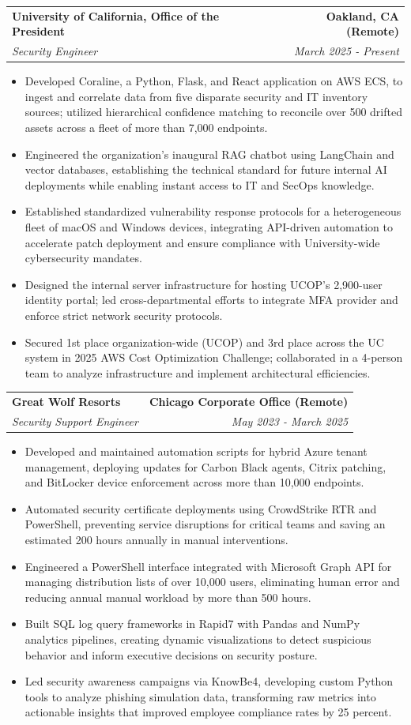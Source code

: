 \documentclass[letterpaper,10pt]{article}
\makeatletter
\newcommand{\resumeItem}[1]{\item\small{#1}}
\newcommand{\resumeItemListStart}{\begin{itemize}}
\newcommand{\resumeItemListEnd}{\end{itemize}\vspace{-2pt}}
\newcommand{\resumeSubheading}[4]{%
  \vspace{-2pt}\item
  \begin{tabular*}{\textwidth}[t]{l@{\extracolsep{\fill}}r}
    \textbf{\large #1} & \textbf{\small #2} \\
    \textit{\large #3} & \textit{\small #4} \\
  \end{tabular*}\vspace{-2pt}
}
\makeatother
\begin{document}
\resumeSubheading
  {University of California, Office of the President}{Oakland, CA (Remote)}
  {Security Engineer}{March 2025 - Present}
  \vspace{4pt}
\resumeItemListStart
  \resumeItem{Developed Coraline, a Python, Flask, and React application on AWS ECS, to ingest and correlate data from five disparate security and IT inventory sources; utilized hierarchical confidence matching to reconcile over 500 drifted assets across a fleet of more than 7,000 endpoints.}
  \resumeItem{Engineered the organization's inaugural RAG chatbot using LangChain and vector databases, establishing the technical standard for future internal AI deployments while enabling instant access to IT and SecOps knowledge.}
  \resumeItem{Established standardized vulnerability response protocols for a heterogeneous fleet of macOS and Windows devices, integrating API-driven automation to accelerate patch deployment and ensure compliance with University-wide cybersecurity mandates.}
  \resumeItem{Designed the internal server infrastructure for hosting UCOP's 2,900-user identity portal; led cross-departmental efforts to integrate MFA provider and enforce strict network security protocols.}
  \resumeItem{Secured 1st place organization-wide (UCOP) and 3rd place across the UC system in 2025 AWS Cost Optimization Challenge; collaborated in a 4-person team to analyze infrastructure and implement architectural efficiencies.}  

  \resumeItemListEnd
\vspace{6pt}

\resumeSubheading
  {Great Wolf Resorts}{Chicago Corporate Office (Remote)}
  {Security Support Engineer}{May 2023 - March 2025}
\vspace{4pt}
\resumeItemListStart
  \resumeItem{Developed and maintained automation scripts for hybrid Azure tenant management, deploying updates for Carbon Black agents, Citrix patching, and BitLocker device enforcement across more than 10,000 endpoints.}
  \resumeItem{Automated security certificate deployments using CrowdStrike RTR and PowerShell, preventing service disruptions for critical teams and saving an estimated 200 hours annually in manual interventions.}
  \resumeItem{Engineered a PowerShell interface integrated with Microsoft Graph API for managing distribution lists of over 10,000 users, eliminating human error and reducing annual manual workload by more than 500 hours.}
  \resumeItem{Built SQL log query frameworks in Rapid7 with Pandas and NumPy analytics pipelines, creating dynamic visualizations to detect suspicious behavior and inform executive decisions on security posture.}
  \resumeItem{Led security awareness campaigns via KnowBe4, developing custom Python tools to analyze phishing simulation data, transforming raw metrics into actionable insights that improved employee compliance rates by 25 percent.}
\resumeItemListEnd
\vspace{6pt}
\end{document}
